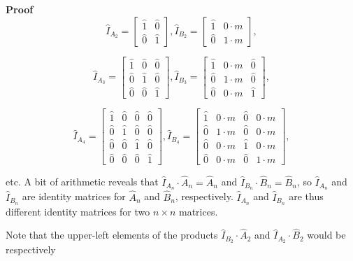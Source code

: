 \documentclass[10pt,letterpaper]{article}
\newenvironment{proof}{\noindent\textbf{Proof} }{\qed \newline}
\newcommand{\qed}{\nobreak \ifvmode \relax \else
      \ifdim\lastskip<1.5em \hskip-\lastskip
      \hskip1.5em plus0em minus0.5em \fi \nobreak
      \vrule height0.75em width0.5em depth0.25em\fi}
\numberwithin{equation}{section}
\begin{document}
\begin{proof}
\[ \hat I_{A_2} = \left[ \begin{matrix} 
  \hat 1 & \hat 0 \\
  \hat 0 & \hat 1
 \end{matrix} \right] ,
\hat I_{B_2} = \left[ \begin{matrix} 
  \hat 1 & 0 \cdot m \\
  \hat 0 & 1 \cdot m
 \end{matrix} \right] , \]
 
 \[ \hat I_{A_3} = \left[ \begin{matrix} 
  \hat 1 & \hat 0 & \hat 0 \\
  \hat 0 & \hat 1 & \hat 0 \\
  \hat 0 & \hat 0 & \hat 1
 \end{matrix} \right] ,
 \hat I_{B_3} = \left[ \begin{matrix} 
  \hat 1 & 0 \cdot m & \hat 0 \\
  \hat 0 & 1 \cdot m & \hat 0 \\
  \hat 0 & 0 \cdot m & \hat 1
 \end{matrix} \right] , \]
 
 \[ \hat I_{A_4} = \left[ \begin{matrix} 
  \hat 1 & \hat 0 & \hat 0 & \hat 0 \\
  \hat 0 & \hat 1 & \hat 0 & \hat 0 \\
  \hat 0 & \hat 0 & \hat 1 & \hat 0 \\
  \hat 0 & \hat 0 & \hat 0 & \hat 1
 \end{matrix} \right] ,
 \hat I_{B_4} = \left[ \begin{matrix} 
  \hat 1 & 0 \cdot m & \hat 0 & 0 \cdot m \\
  \hat 0 & 1 \cdot m & \hat 0 & 0 \cdot m \\
  \hat 0 & 0 \cdot m & \hat 1 & 0 \cdot m \\
  \hat 0 & 0 \cdot m & \hat 0 & 1 \cdot m
 \end{matrix} \right] , \]
 
etc.  A bit of arithmetic reveals that $\hat I_{A_n} \cdot \hat A_n =
\hat A_n$ and $\hat I_{B_n} \cdot \hat B_n = \hat B_n$, so $\hat
I_{A_n}$ and $\hat I_{B_n}$ are identity matrices for $\hat A_n$ and
$\hat B_n$, respectively.  $\hat I_{A_n}$ and $\hat I_{B_n}$ are thus
different identity matrices for two $n \times n$ matrices.\end{proof}

Note that the upper-left elements of the products $\hat I_{B_2} \cdot
\hat A_2$ and $\hat I_{A_2} \cdot \hat B_2$ would be respectively
\end{document}
